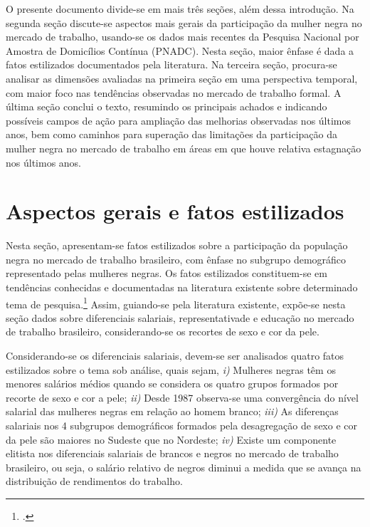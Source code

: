 \documentclass[12pt]{article}
\begin{document}
\par O presente documento divide-se em mais três seções, além dessa introdução. Na segunda seção discute-se aspectos mais gerais da participação da mulher negra no mercado de trabalho, usando-se os dados mais recentes da Pesquisa Nacional por Amostra de Domicílios Contínua (PNADC). Nesta seção, maior ênfase é dada a fatos estilizados documentados pela literatura. Na terceira seção, procura-se analisar as dimensões avaliadas na primeira seção em uma perspectiva temporal, com maior foco nas tendências observadas no mercado de trabalho formal. A última seção conclui o texto, resumindo os principais achados e indicando possíveis campos de ação para ampliação das melhorias observadas nos últimos anos, bem como caminhos para superação das limitações da participação da mulher negra no mercado de trabalho em áreas em que houve relativa estagnação nos últimos anos.

\section{Aspectos gerais e fatos estilizados} \label{overview}

\par Nesta seção, apresentam-se fatos estilizados sobre a participação da população negra no mercado de trabalho brasileiro, com ênfase no subgrupo demográfico representado pelas mulheres negras. Os fatos estilizados constituem-se em tendências conhecidas e documentadas na literatura existente sobre determinado tema de pesquisa.\footcite[178]{kaldor1961capital} Assim, guiando-se pela literatura existente, expõe-se nesta seção dados sobre diferenciais salariais, representativade e educação no mercado de trabalho brasileiro, considerando-se os recortes de sexo e cor da pele.

\par Considerando-se os diferenciais salariais, devem-se ser analisados quatro fatos estilizados sobre o tema sob análise, quais sejam, \textit{i)} Mulheres negras têm os menores salários médios quando se considera os quatro grupos formados por recorte de sexo e cor a pele; \textit{ii)} Desde 1987 observa-se uma convergência do nível salarial das mulheres negras em relação ao homem branco; \textit{iii)} As diferenças salariais nos 4 subgrupos de\-mo\-grá\-fi\-cos formados pela desagregação de sexo e cor da pele são maiores no Sudeste que no Nordeste; \textit{iv)} Existe um componente elitista nos diferenciais salariais de brancos e negros no mercado de trabalho brasileiro, ou seja, o salário relativo de negros diminui a medida que se avança na distribuição de rendimentos do trabalho.
\end{document}
